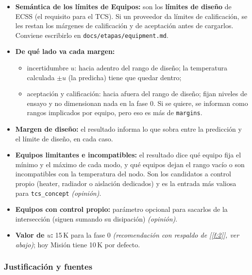 \documentclass[11pt,a4paper]{article}
\newcommand{\code}[1]{\texttt{#1}}
\newcommand{\op}[1]{\textcolor{opinion}{\textit{(#1)}}}
\newcommand{\f}[1]{\ref{f:#1}}
\begin{document}
\begin{itemize}
  Para los apagados se toma el mínimo de encendido si existe: cualquier equipo apagado puede tener que encenderse (p.~ej. al salir del modo seguro) \op{opinión, conservadora}. Sin límites no operativos se usan los operativos, que según Equipos están contenidos en ellos \op{opinión, conservadora}.
  \item \textbf{Semántica de los límites de Equipos:} son los \textbf{límites de diseño} de ECSS (el requisito para el TCS). Si un proveedor da límites de calificación, se les restan los márgenes de calificación y de aceptación antes de cargarlos. Conviene escribirlo en \code{docs/etapas/equipment.md}.
  \item \textbf{De qué lado va cada margen:}
  \begin{itemize}
    \item incertidumbre $u$: hacia adentro del rango de diseño; la temperatura calculada $\pm u$ (la predicha) tiene que quedar dentro;
    \item aceptación y calificación: hacia afuera del rango de diseño; fijan niveles de ensayo y no dimensionan nada en la fase 0. Si se quiere, se informan como rangos implicados por equipo, pero eso es más de \code{margins}.
  \end{itemize}
  \item \textbf{Margen de diseño:} el resultado informa lo que sobra entre la predicción y el límite de diseño, en cada caso.
  \item \textbf{Equipos limitantes e incompatibles:} el resultado dice qué equipo fija el mínimo y el máximo de cada modo, y qué equipos dejan el rango vacío o son incompatibles con la temperatura del nodo. Son los candidatos a control propio (heater, radiador o aislación dedicados) y es la entrada más valiosa para \code{tcs\_concept} \op{opinión}.
  \item \textbf{Equipos con control propio:} parámetro opcional para sacarlos de la intersección (siguen sumando su disipación) \op{opinión}.
  \item \textbf{Valor de $u$:} 15\,K para la fase 0 \op{recomendación con respaldo de [\f{2}], ver abajo}; hoy Misión tiene 10\,K por defecto.
\end{itemize}

\subsubsection*{Justificación y fuentes}
\end{document}
